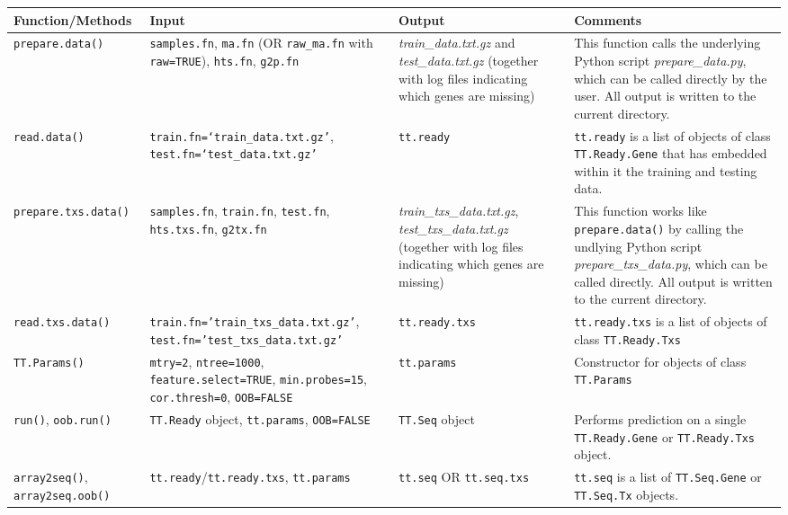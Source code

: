 \documentclass[a4paper,12pt]{article}
\begin{document}
\begin{table}[H]
\scriptsize
\centering
\begin{tabular}{|p{2.5cm}|p{4cm}|p{4cm}|p{5cm}|}
\hline
\textbf{Function/Methods} & \textbf{Input} & \textbf{Output} & \textbf{Comments} \\
\hline
\texttt{prepare.data()} & \texttt{samples.fn}, \texttt{ma.fn} (OR \texttt{raw\_ma.fn} with \texttt{raw=TRUE}), \texttt{hts.fn}, \texttt{g2p.fn} & \textit{train\_data.txt.gz} and \textit{test\_data.txt.gz}  (together with log files indicating which genes are missing) & This function calls the underlying \textsf{Python} script \textit{prepare\_data.py}, which can be called directly by the user. All output is written to the current directory. \\
\hline
\texttt{read.data()} & \texttt{train.fn=`train\_data.txt.gz'}, \texttt{test.fn=`test\_data.txt.gz'} & \texttt{tt.ready} & \texttt{tt.ready} is a list of objects of class \texttt{TT.Ready.Gene} that has embedded within it the training and testing data. \\
\hline
\texttt{prepare.txs.data()} & \texttt{samples.fn}, \texttt{train.fn}, \texttt{test.fn}, \texttt{hts.txs.fn}, \texttt{g2tx.fn} & \textit{train\_txs\_data.txt.gz}, \textit{test\_txs\_data.txt.gz} (together with log files indicating which genes are missing) & 
This function works like \texttt{prepare.data()} by calling the undlying \textsf{Python} script \textit{prepare\_txs\_data.py}, which can be called directly. All output is written to the current directory. \\
\hline
\texttt{read.txs.data()} & \texttt{train.fn='train\_txs\_data.txt.gz'}, \texttt{test.fn='test\_txs\_data.txt.gz'} & \texttt{tt.ready.txs} & \texttt{tt.ready.txs} is a list of objects of class \texttt{TT.Ready.Txs} \\
\hline
\texttt{TT.Params()} & \texttt{mtry=2}, \texttt{ntree=1000}, \texttt{feature.select=TRUE}, \texttt{min.probes=15}, \texttt{cor.thresh=0}, \texttt{OOB=FALSE} & \texttt{tt.params} & Constructor for objects of class \texttt{TT.Params} \\
\hline
\texttt{run()}, \texttt{oob.run()} & \texttt{TT.Ready} object, \texttt{tt.params}, \texttt{OOB=FALSE} & \texttt{TT.Seq} object & Performs prediction on a single \texttt{TT.Ready.Gene} or \texttt{TT.Ready.Txs} object. \\
\hline
\texttt{array2seq()}, \texttt{array2seq.oob()} & \texttt{tt.ready}/\texttt{tt.ready.txs}, \texttt{tt.params} & \texttt{tt.seq} OR \texttt{tt.seq.txs} & \texttt{tt.seq} is a list of \texttt{TT.Seq.Gene} or \texttt{TT.Seq.Tx} objects. \\

\end{tabular}
\end{table}
\end{document}
